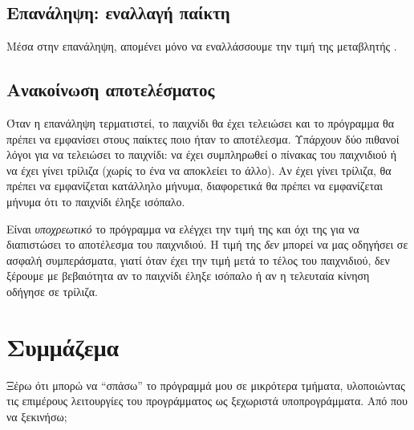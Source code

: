 \documentclass[a4paper,11pt,oneside]{book}
\begin{document}
\vspace{-6pt}
\subsection{Επανάληψη: εναλλαγή παίκτη}

Μέσα στην επανάληψη, απομένει μόνο να εναλλάσσουμε την τιμή της μεταβλητής .


\vspace{-6pt}
\subsection{Ανακοίνωση αποτελέσματος}

Όταν η επανάληψη τερματιστεί, το παιχνίδι θα έχει τελειώσει και το πρόγραμμα θα πρέπει να εμφανίσει στους παίκτες ποιο ήταν το αποτέλεσμα. Υπάρχουν δύο πιθανοί λόγοι για να τελειώσει το παιχνίδι: να έχει συμπληρωθεί ο πίνακας του παιχνιδιού ή να έχει γίνει τρίλιζα (χωρίς το ένα να αποκλείει το άλλο). Αν έχει γίνει τρίλιζα, θα πρέπει να εμφανίζεται κατάλληλο μήνυμα, διαφορετικά θα πρέπει να εμφανίζεται μήνυμα ότι το παιχνίδι έληξε ισόπαλο.


Είναι \emph{υποχρεωτικό} το πρόγραμμα να ελέγχει την τιμή της  και όχι της  για να διαπιστώσει το αποτέλεσμα του παιχνιδιού. Η τιμή της  \emph{δεν} μπορεί να μας οδηγήσει σε ασφαλή συμπεράσματα, γιατί όταν έχει την τιμή  μετά το τέλος του παιχνιδιού, δεν ξέρουμε με βεβαιότητα αν το παιχνίδι έληξε ισόπαλο ή αν η τελευταία κίνηση οδήγησε σε τρίλιζα.

\section{Συμμάζεμα}

\begin{question}
Ξέρω ότι μπορώ να ``σπάσω'' το πρόγραμμά μου σε μικρότερα τμήματα, υλοποιώντας τις επιμέρους λειτουργίες του προγράμματος ως ξεχωριστά υποπρογράμματα. Από που να ξεκινήσω;
\end{question}

\end{document}
